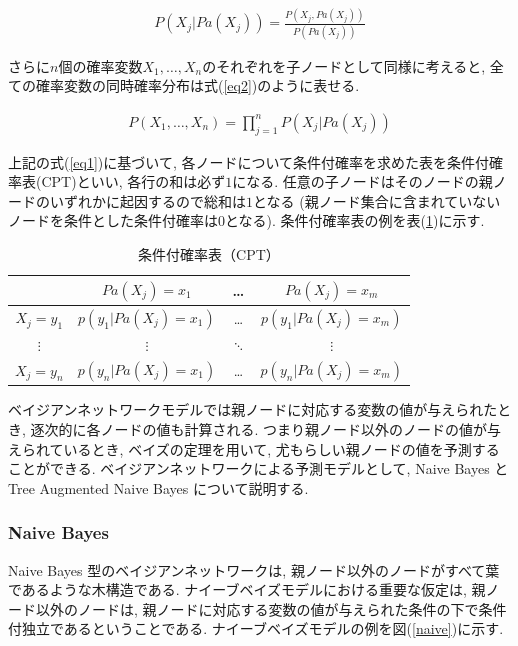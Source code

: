 \documentclass[a4paper]{jarticle}
\begin{document}
\begin{eqnarray}
\label{eq1}
P(X_j | Pa(X_j)) = \frac{P(X_j, Pa(X_j))}{P(Pa(X_j))} 
\end{eqnarray}

さらに$n$個の確率変数$X_1, \dots, X_n$のそれぞれを子ノードとして同様に考えると, 全ての確率変数の同時確率分布は式(\ref{eq2})のように表せる.

\begin{eqnarray}
\label{eq2}
P(X_1, \dots, X_n) = \prod_{j=1}^n P(X_j | Pa(X_j))
\end{eqnarray}

上記の式(\ref{eq1})に基づいて, 各ノードについて条件付確率を求めた表を条件付確率表(CPT)といい, 各行の和は必ず$1$になる. 任意の子ノードはそのノードの親ノードのいずれかに起因するので総和は$1$となる (親ノード集合に含まれていないノードを条件とした条件付確率は$0$となる). 条件付確率表の例を表(\ref{cpt})に示す. 

\begin{table}[H]
\begin{center}
\caption{条件付確率表（CPT）}   %
\label{cpt}   %
\begin{tabular}{|c||c|c|c|}   %
\hline
 & $Pa(X_{j})=x_{1}$ & \dots & $Pa(X_{j})=x_{m}$
\\ \hline
$X_j=y_1$ & $p(y_1|Pa(X_j)=x_1)$ & \dots & $p(y_1|Pa(X_j)=x_m)$
\\ \hline
$\vdots$ & $\vdots$ & $\ddots$ & $\vdots$
\\ \hline
$X_j=y_n$ & $ p(y_n|Pa(X_j)=x_1)$ & \dots & $p(y_n|Pa(X_j)=x_m)$
\\ \hline
\end{tabular}
\end{center}
\end{table}

ベイジアンネットワークモデルでは親ノードに対応する変数の値が与えられたとき, 逐次的に各ノードの値も計算される. つまり親ノード以外のノードの値が与えられているとき, ベイズの定理を用いて, 尤もらしい親ノードの値を予測することができる. ベイジアンネットワークによる予測モデルとして, Naive Bayes と Tree Augmented Naive Bayes について説明する.

\subsubsection{Naive Bayes}

Naive Bayes 型のベイジアンネットワークは, 親ノード以外のノードがすべて葉であるような木構造である. ナイーブベイズモデルにおける重要な仮定は, 親ノード以外のノードは, 親ノードに対応する変数の値が与えられた条件の下で条件付独立であるということである. ナイーブベイズモデルの例を図(\ref{naive})に示す.
\end{document}
